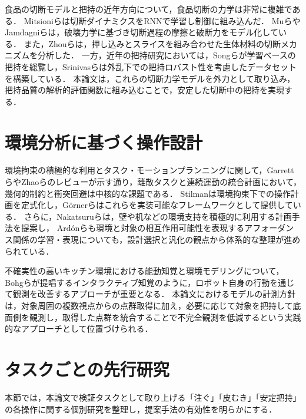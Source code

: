 食品の切断モデルと把持の近年方向について，食品切断の力学は非常に複雑である．
Mitsioniら\cite{Mitsioni2021FoodCuttingDynamics}は切断ダイナミクスをRNNで学習し制御に組み込んだ．
Muら\cite{Mu2019RoboticCutting}やJamdagniら\cite{Jamdagni2019FractureMechanicsCutting}は，破壊力学に基づき切断過程の摩擦と破断力をモデル化している．
また，Zhouら\cite{Zhou2006PressingSlicingCutting_1, Zhou2006PressingSlicingCutting_2}は，押し込みとスライスを組み合わせた生体材料の切断メカニズムを分析した．
一方，近年の把持研究においては，Songら\cite{Song2025DexterousGraspingOverview}が学習ベースの把持を総覧し，Srinivasら\cite{Srinivas2025GraspFactory}は外乱下での把持ロバスト性を考慮したデータセットを構築している．
本論文は，これらの切断力学モデルを外力として取り込み，把持品質の解析的評価関数に組み込むことで，安定した切断中の把持を実現する．

\section{環境分析に基づく操作設計}
環境拘束の積極的な利用とタスク・モーションプランニングに関して，Garrettら\cite{Garrett2021TAMPSurvey}やZhaoら\cite{Zhao2024OptTAMPSurvey}のレビューが示す通り，離散タスクと連続運動の統合計画において，幾何的制約と衝突回避は中核的な課題である．
Stilman\cite{Stilman2011ConstrainedManipulation}は環境拘束下での操作計画を定式化し，Görnerら\cite{Gorner2019MoveItTaskConstructor}はこれらを実装可能なフレームワークとして提供している．
さらに，Nakatsuruら\cite{Nakatsuru2023EnvironmentSupport}は，壁や机などの環境支持を積極的に利用する計画手法を提案し，
Ard{\'o}nら\cite{Ardon2021AffordanceReview}も環境と対象の相互作用可能性を表現するアフォーダンス関係の学習・表現についても，設計選択と汎化の観点から体系的な整理が進められている．

不確実性の高いキッチン環境における能動知覚と環境モデリングについて，Bohgら\cite{Bohg2016InteractivePerception}が提唱するインタラクティブ知覚のように，ロボット自身の行動を通じて観測を改善するアプローチが重要となる．
本論文におけるモデルの計測方針は，対象周囲の複数視点からの点群取得に加え，必要に応じて対象を把持して底面側を観測し，取得した点群を統合することで不完全観測を低減するという実践的なアプローチとして位置づけられる．

\section{タスクごとの先行研究}
本節では，本論文で検証タスクとして取り上げる「注ぐ」「皮むき」「安定把持」の各操作に関する個別研究を整理し，提案手法の有効性を明らかにする．

